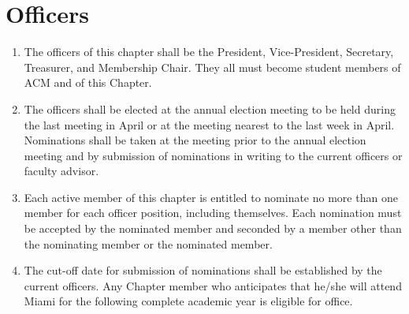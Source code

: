 \documentclass{article}
\begin{document}
\section{Officers}
\begin{enumerate}
	\item The officers of this chapter shall be the President, Vice-President,
		Secretary, Treasurer, and Membership Chair. They all must become
		student members of ACM and of this Chapter.

	\item The officers shall be elected at the annual election meeting to be
		held during the last meeting in April or at the meeting nearest to the
		last week in April. Nominations shall be taken at the meeting prior to
		the annual election meeting and by submission of nominations in writing
		to the current officers or faculty advisor.

	\item Each active member of this chapter is entitled to nominate no more
		than one member for each officer position, including themselves. Each
		nomination must be accepted by the nominated member and seconded by
		a member other than the nominating member or the nominated member.

	\item The cut-off date for submission of nominations shall be established by
		the current officers.  Any Chapter member who anticipates that he/she
		will attend Miami for the following complete academic year is eligible
		for office.

\end{enumerate}
\end{document}
